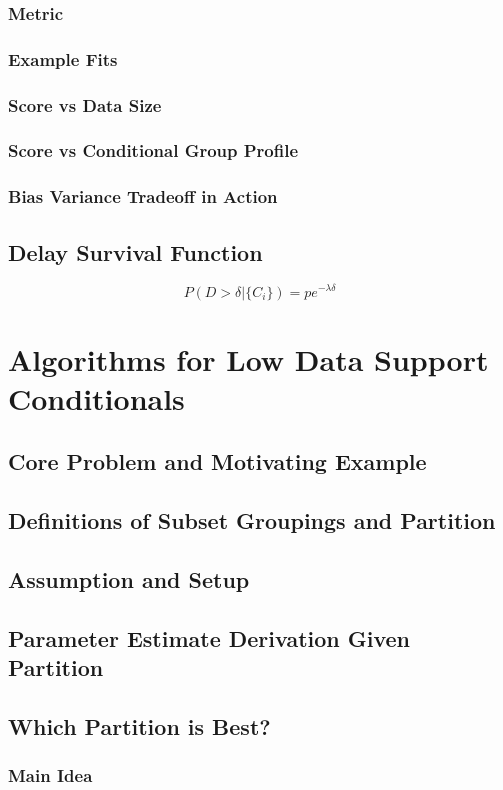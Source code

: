 \documentclass{article}
\begin{document}
\subsubsection{Metric}
\subsubsection{Example Fits}
\subsubsection{Score vs Data Size}
\subsubsection{Score vs Conditional Group Profile}
\subsubsection{Bias Variance Tradeoff in Action}

\subsection{Delay Survival Function}
$$P(D>\delta | \{C_i\}) = p e^{-\lambda \delta}$$

\section{Algorithms for Low Data Support Conditionals}
\subsection{Core Problem and Motivating Example}
\subsection{Definitions of Subset Groupings and Partition}
\subsection{Assumption and Setup}
\subsection{Parameter Estimate Derivation Given Partition}
\subsection{Which Partition is Best?}
\subsubsection{Main Idea}
\end{document}

